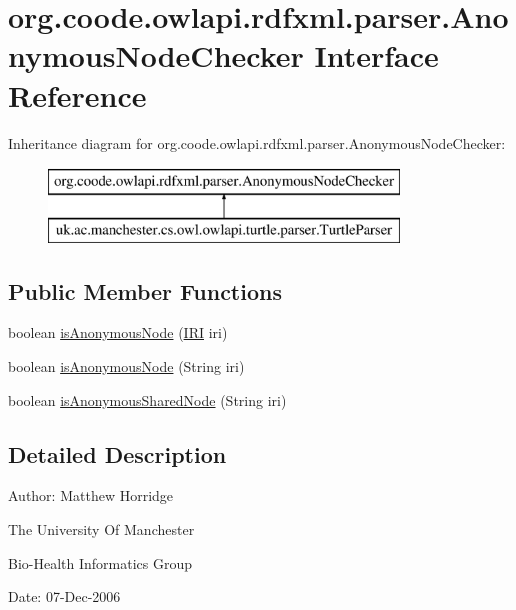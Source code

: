 \hypertarget{interfaceorg_1_1coode_1_1owlapi_1_1rdfxml_1_1parser_1_1_anonymous_node_checker}{\section{org.\-coode.\-owlapi.\-rdfxml.\-parser.\-Anonymous\-Node\-Checker Interface Reference}
\label{interfaceorg_1_1coode_1_1owlapi_1_1rdfxml_1_1parser_1_1_anonymous_node_checker}
}
Inheritance diagram for org.\-coode.\-owlapi.\-rdfxml.\-parser.\-Anonymous\-Node\-Checker\-:\begin{figure}[H]
\begin{center}
\leavevmode
\includegraphics[height=2.000000cm]{interfaceorg_1_1coode_1_1owlapi_1_1rdfxml_1_1parser_1_1_anonymous_node_checker}
\end{center}
\end{figure}
\subsection*{Public Member Functions}
\begin{DoxyCompactItemize}
\item 
boolean \hyperlink{interfaceorg_1_1coode_1_1owlapi_1_1rdfxml_1_1parser_1_1_anonymous_node_checker_ada78fcc9e9869d53956b92b47f8d63ae}{is\-Anonymous\-Node} (\hyperlink{classorg_1_1semanticweb_1_1owlapi_1_1model_1_1_i_r_i}{I\-R\-I} iri)
\item 
boolean \hyperlink{interfaceorg_1_1coode_1_1owlapi_1_1rdfxml_1_1parser_1_1_anonymous_node_checker_a5eb8742840b052e8aceee011fb447e48}{is\-Anonymous\-Node} (String iri)
\item 
boolean \hyperlink{interfaceorg_1_1coode_1_1owlapi_1_1rdfxml_1_1parser_1_1_anonymous_node_checker_aae8ad5a85d5662c8e52a4b3410a411e7}{is\-Anonymous\-Shared\-Node} (String iri)
\end{DoxyCompactItemize}


\subsection{Detailed Description}
Author\-: Matthew Horridge\par
 The University Of Manchester\par
 Bio-\/\-Health Informatics Group\par
 Date\-: 07-\/\-Dec-\/2006\par
\par
 


